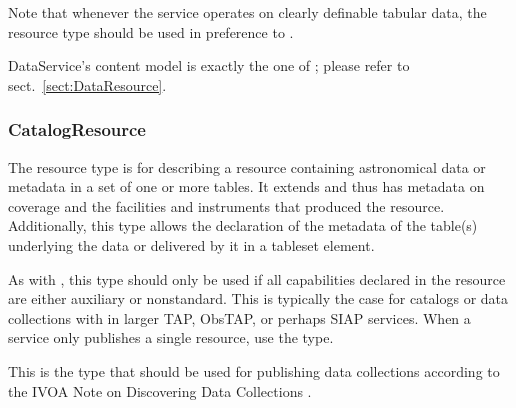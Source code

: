 \documentclass[11pt,a4paper]{ivoa}
\begin{document}
Note that whenever the service operates on clearly definable tabular
data, the  resource type should be used in
preference to .

DataService's content model is exactly the one of
; please refer to sect.~\ref{sect:DataResource}.




\subsubsection{CatalogResource}
\label{sect:CatalogResource}


The  resource type is for describing a
resource containing astronomical data or metadata in a set of one or
more tables.  It extends  and thus has metadata
on coverage and the facilities and instruments that produced the
resource.  Additionally, this type allows the
declaration of the metadata of the table(s) underlying the data or
delivered by it in a tableset element.

As with , this type should only be used if all
capabilities declared in the resource are either auxiliary or
nonstandard.  This is typically the case for catalogs or data
collections with in larger TAP, ObsTAP, or perhaps SIAP services.  When
a service only publishes a single resource, use the
 type.

This is the type that should be used for publishing data collections
according to the IVOA Note on Discovering Data Collections 
\citep{note:DataCollect}.
\end{document}
